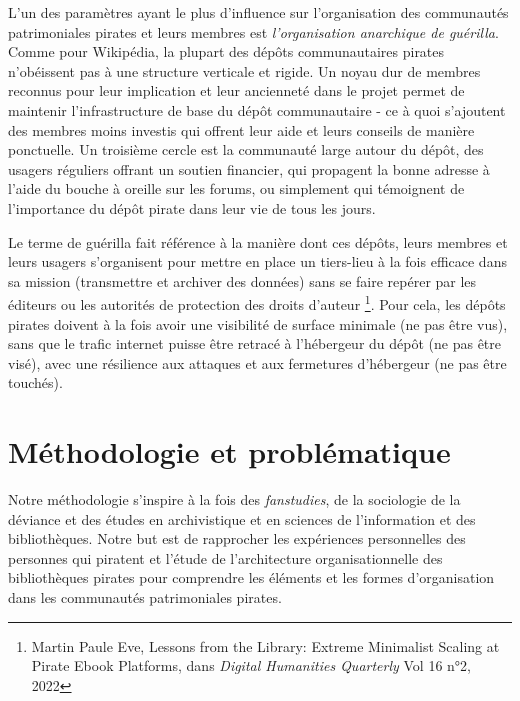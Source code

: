 L'un des paramètres ayant le plus d'influence sur l'organisation des communautés patrimoniales pirates et leurs membres est \textit{l'organisation anarchique de guérilla}. Comme pour Wikipédia, la plupart des dépôts communautaires pirates n'obéissent pas à une structure verticale et rigide. Un noyau dur de membres reconnus pour leur implication et leur ancienneté dans le projet permet de maintenir l'infrastructure de base du dépôt communautaire - ce à quoi s'ajoutent des membres moins investis qui offrent leur aide et leurs conseils de manière ponctuelle. Un troisième cercle est la communauté large autour du dépôt, des usagers réguliers offrant un soutien financier, qui propagent la bonne adresse à l'aide du bouche à oreille sur les forums, ou simplement qui témoignent de l'importance du dépôt pirate dans leur vie de tous les jours. 

Le terme de guérilla fait référence à la manière dont ces dépôts, leurs membres et leurs usagers s'organisent pour mettre en place un tiers-lieu à la fois efficace dans sa mission (transmettre et archiver des données) sans se faire repérer par les éditeurs ou les autorités de protection des droits d'auteur \footnote{Martin Paule Eve, Lessons from the Library: Extreme Minimalist Scaling at Pirate Ebook Platforms, dans \textit{Digital Humanities Quarterly} Vol 16 n°2, 2022}. Pour cela, les dépôts pirates doivent à la fois avoir une visibilité de surface minimale (ne pas être vus), sans que le trafic internet puisse être retracé à l'hébergeur du dépôt (ne pas être visé), avec une résilience aux attaques et aux fermetures d'hébergeur (ne pas être touchés).

\section*{Méthodologie et problématique}
Notre méthodologie s'inspire à la fois des \textit{fanstudies}, de la sociologie de la déviance et des études en archivistique et en sciences de l'information et des bibliothèques. Notre but est de rapprocher les expériences personnelles des personnes qui piratent et l'étude de l'architecture organisationnelle des bibliothèques pirates pour comprendre les éléments et les formes d'organisation dans les communautés patrimoniales pirates. \newline

